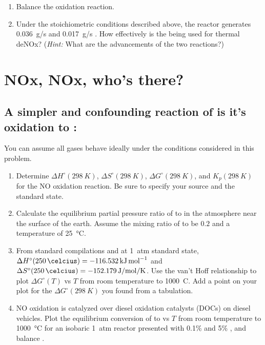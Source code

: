 \documentclass[11pt]{article}
\begin{document}
\begin{center}
\end{center}
\begin{enumerate}
\item Balance the  oxidation reaction.

\item Under the stoichiometric conditions described above, the reactor generates \SI{0.036}{g/s}  and \SI{0.017}{g/s} . How effectively is the  being used for thermal deNOx? (\emph{Hint:} What are the advancements of the two reactions?)
\end{enumerate}

\section{NOx, NOx, who's there?}
\label{sec:orgf06a8b0}
\subsection{A simpler and confounding reaction of  is it's oxidation to :}
\label{sec:org487fe00}
\begin{center}
\end{center}
\noindent You can assume all gases behave ideally under the conditions considered in this problem.

\begin{enumerate}
\item Determine  \(\Delta H^\circ (\SI{298}{K})\),  \(\Delta S^\circ (\SI{298}{K})\), \(\Delta G^\circ (\SI{298}{K})\), and  \(K_p (\SI{298}{K})\) for the NO oxidation reaction. Be sure to specify your source and the standard state.

\item Calculate the equilibrium partial pressure ratio of  to  in the atmosphere near the surface of the earth. Assume the mixing ratio of  to be \(0.2\) and a temperature of \SI{25}{\celsius}.

\item From standard compilations and at \SI{1}{atm} standard state, \(\Delta H^\circ (\SI{250}{\celcius}) = \SI{-116.532}{\kJ\per\mol}\) and \(\Delta S^\circ (\SI{250}{\celcius}) = \SI{-152.179}{J\per\mol\per\kelvin}\).  Use the van't Hoff relationship to plot \(\Delta G^\circ (T)\) vs \(T\) from room temperature to \SI{1000}{C}. Add a point on your plot for the \(\Delta G^\circ (\SI{298}{K})\) you found from a tabulation.

\item NO oxidation is catalyzed over diesel oxidation catalysts (DOCs) on diesel vehicles. Plot the equilibrium conversion of  to  vs \(T\) from room temperature to \SI{1000}{\celsius} for an isobaric \SI{1}{atm} reactor presented with 0.1\%  and 5\% , and balance .
\end{enumerate}
\end{document}
